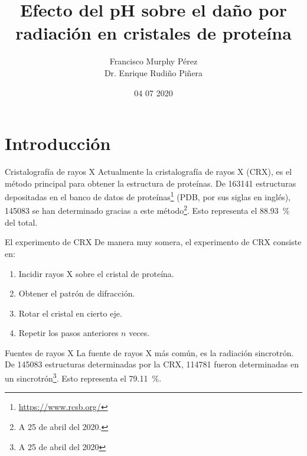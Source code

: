 \documentclass{beamer}
\title{Efecto del pH sobre el daño por radiación en cristales de proteína}
\author{Francisco Murphy Pérez \\ Dr. Enrique Rudiño Piñera}
\institute{Instituto de Biotecnología \\ Universidad Nacional Autónoma de México}
\date{04 07 2020}
\begin{document}
\begin{frame}
	\maketitle %
\end{frame}
\section{Introducción}
\begin{frame}{Cristalografía de rayos X}
Actualmente la cristalografía de rayos X (CRX), es el método principal para obtener la estructura de proteínas. De 163141 estructuras depositadas en el banco de datos de proteínas\footnote{\url{https://www.rcsb.org/}} (PDB, por sus siglas en inglés), 145083 se han determinado gracias a este método\footnote{A 25 de abril del 2020.}. Esto representa el \SI{88.93}{\percent} del total.
\end{frame}
\begin{frame}{El experimento de CRX}
De manera muy somera, el experimento de CRX consiste en:
 \begin{enumerate}
  \item Incidir \alert{rayos X} sobre el cristal de proteína. 
  \item Obtener el patrón de difracción. 
  \item Rotar el cristal en cierto eje. 
  \item Repetir los pasos anteriores $n$ veces.
 \end{enumerate}
\end{frame}
\begin{frame}{Fuentes de rayos X}
 La fuente de rayos X más común, es la radiación sincrotrón. De 145083 estructuras determinadas por la CRX, 114781 fueron determinadas en un sincrotrón\footnote{A 25 de abril del 2020}. Esto representa el \SI{79.11}{\percent}.
\end{frame}
\end{document}
